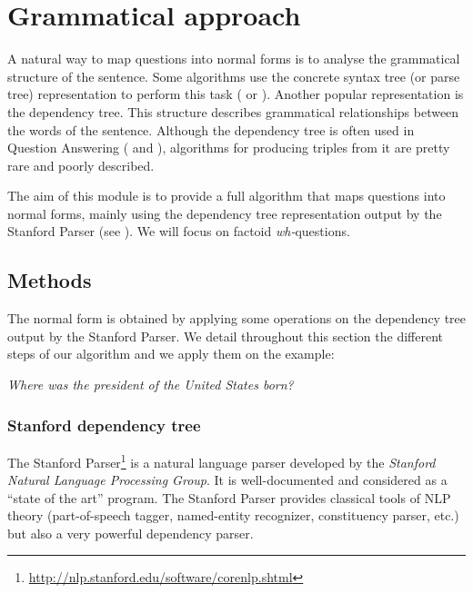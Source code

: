 \section{Grammatical approach}
\label{gramap}

A natural way to map questions into normal forms is to analyse the grammatical structure of the sentence. Some algorithms use the concrete syntax tree (or parse tree) representation to perform this task (\cite{parsetree} or \cite{parsetree2}). Another popular representation is the dependency tree. This structure describes grammatical relationships between the words of the sentence. Although the dependency tree is often used in Question Answering (\cite{Zouaq1} and \cite{Zouaq2}), algorithms for producing triples from it are pretty rare and poorly described.

The aim of this module is to provide a full algorithm that maps questions into normal forms, mainly using the dependency tree representation output by the Stanford Parser (see \cite{stanfordmanual}). We will focus on factoid \textit{wh-}questions.


\subsection{Methods}
\label{met}

The normal form is obtained by applying some operations on the dependency tree output by the Stanford Parser. We detail throughout this section the different steps of our algorithm and we apply them on the example:
\begin{center}
 \textit{Where was the president of the United States born?}
\end{center}


\subsubsection{Stanford dependency tree}
\label{sdt}

The Stanford Parser\footnote{\url{http://nlp.stanford.edu/software/corenlp.shtml}} is a natural language parser developed by the \emph{Stanford Natural Language Processing Group}. It is well-documented and considered as a ``state of the art'' program. The Stanford Parser provides classical tools of NLP theory (part-of-speech  tagger, named-entity recognizer, constituency parser, etc.) but also a very powerful dependency parser.

